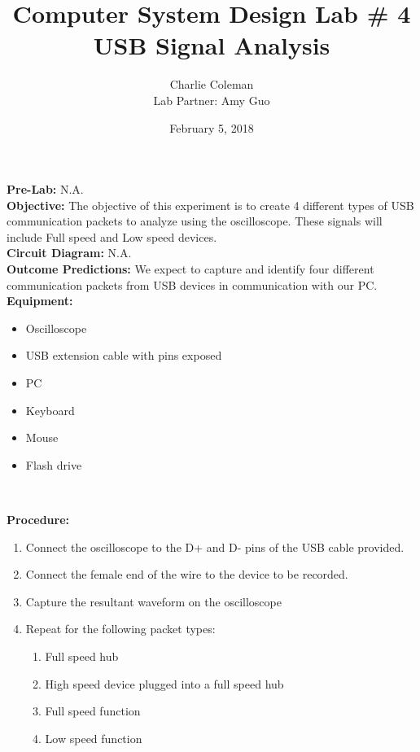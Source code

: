 \documentclass{article}
\title{Computer System Design Lab \# 4\\USB Signal Analysis}
\author{Charlie Coleman \\ Lab Partner: Amy Guo}
\date{February 5, 2018}
\newcommand{\sect}[1]{\noindent\textbf{#1}}
\begin{document}
\maketitle
\pagebreak

\sect{Pre-Lab:} N.A.\\

\sect{Objective:} The objective of this experiment is to create 4 different types of USB communication packets to analyze using the oscilloscope. These signals will include Full speed and Low speed devices.\\

\sect{Circuit Diagram:} N.A.\\

\sect{Outcome Predictions:} We expect to capture and identify four different communication packets from USB devices in communication with our PC.\\

\sect{Equipment:}

\begin{itemize}[noitemsep, nolistsep]
	\item Oscilloscope
	\item USB extension cable with pins exposed
	\item PC
	\item Keyboard
	\item Mouse
	\item Flash drive
\end{itemize}~

\sect{Procedure:}

\begin{enumerate}
	\item Connect the oscilloscope to the D+ and D- pins of the USB cable provided.
	\item Connect the female end of the wire to the device to be recorded.
	\item Capture the resultant waveform on the oscilloscope
	\item Repeat for the following packet types:
	\begin{enumerate}
		\item Full speed hub
		\item High speed device plugged into a full speed hub
		\item Full speed function
		\item Low speed function
	\end{enumerate}
\end{enumerate}~
\end{document}
